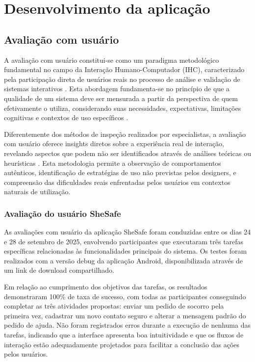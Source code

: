 \chapter{Desenvolvimento da aplicação}
\section{Avaliação com usuário}
A avaliação com usuário constitui-se como um paradigma metodológico fundamental no campo da Interação Humano-Computador (IHC), caracterizado pela participação direta de usuários reais no processo de análise e validação de sistemas interativos \cite{dix2003human}. Esta abordagem fundamenta-se no princípio de que a qualidade de um sistema deve ser mensurada a partir da perspectiva de quem efetivamente o utiliza, considerando suas necessidades, expectativas, limitações cognitivas e contextos de uso específicos \cite{preece2015interaction}.

Diferentemente dos métodos de inspeção realizados por especialistas, a avaliação com usuário oferece insights diretos sobre a experiência real de interação, revelando aspectos que podem não ser identificados através de análises teóricas ou heurísticas \cite{nielsen1994usability}. Esta metodologia permite a observação de comportamentos autênticos, identificação de estratégias de uso não previstas pelos designers, e compreensão das dificuldades reais enfrentadas pelos usuários em contextos naturais de utilização.

\subsection{Avaliação do usuário SheSafe}
As avaliações com usuário da aplicação SheSafe foram conduzidas entre os dias 24 e 28 de setembro de 2025, envolvendo participantes que executaram três tarefas específicas relacionadas às funcionalidades principais do sistema. Os testes foram realizados com a versão debug da aplicação Android, disponibilizada através de um link de download compartilhado.

Em relação ao cumprimento dos objetivos das tarefas, os resultados demonstraram 100\% de taxa de sucesso, com todas as participantes conseguindo completar as três atividades propostas: enviar um pedido de socorro pela primeira vez, cadastrar um novo contato seguro e alterar a mensagem padrão do pedido de ajuda. Não foram registrados erros durante a execução de nenhuma das tarefas, indicando que a interface apresenta boa intuitividade e que os fluxos de interação estão adequadamente projetados para facilitar a conclusão das ações pelos usuários.

